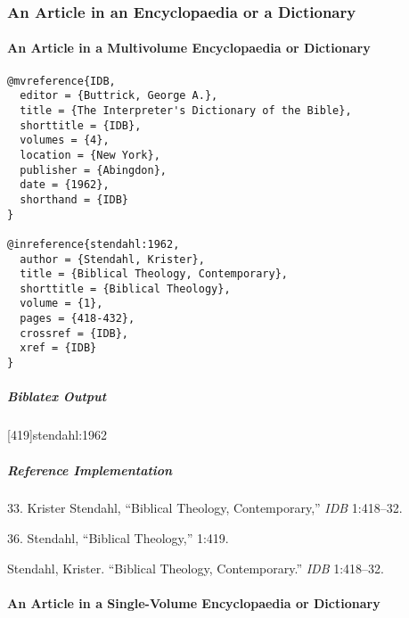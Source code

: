 \documentclass[a4paper]{article}
\newenvironment{biboutput}{%
  \subparagraph{Biblatex Output}
}{\color{black}}
\newenvironment{refimp}{%
  \subparagraph{Reference Implementation}
  \color{reference-colour}
  \rm
}{\par\color{black}}
\begin{document}
\subsubsection{An Article in an Encyclopaedia or a Dictionary}

\paragraph{An Article in a Multivolume Encyclopaedia or Dictionary}

\begin{lstlisting}
@mvreference{IDB,
  editor = {Buttrick, George A.},
  title = {The Interpreter's Dictionary of the Bible},
  shorttitle = {IDB},
  volumes = {4},
  location = {New York},
  publisher = {Abingdon},
  date = {1962},
  shorthand = {IDB}
}

@inreference{stendahl:1962,
  author = {Stendahl, Krister},
  title = {Biblical Theology, Contemporary},
  shorttitle = {Biblical Theology},
  volume = {1},
  pages = {418-432},
  crossref = {IDB},
  xref = {IDB}
}
\end{lstlisting}  

\begin{biboutput}
  [419]{stendahl:1962}
  \toggletrue{fullbibrefs}
  \togglefalse{fullbibrefs}
\end{biboutput}

\begin{refimp}
  \hspace*{\bibindent}33. Krister Stendahl, “Biblical Theology, Contemporary,”
  \emph{IDB} 1:418–32.
  
  \hspace*{\bibindent}36. Stendahl, “Biblical Theology,” 1:419.
  
  Stendahl, Krister. “Biblical Theology, Contemporary.” \emph{IDB} 1:418–32.

\end{refimp}

\paragraph{An Article in a Single-Volume Encyclopaedia or Dictionary}
\end{document}
